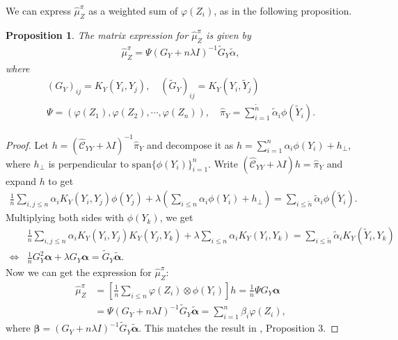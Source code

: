 \documentclass[a4paper]{article}
\renewcommand{\cal}{\mathcal}
\newcommand{\bs}{\boldsymbol}
\newtheorem{proposition}{Proposition}
\begin{document}
We can express $\widehat{\mu}_Z^\pi$ as a weighted sum of $\varphi(Z_i)$, as in the following proposition.
\begin{proposition}\label{prop:muz}
The matrix expression for $\widehat{\mu}_{Z}^\pi$ is given by
\begin{align}
\widehat{\mu}_Z^\pi = \Psi (G_Y + n \lambda I)^{-1} \tilde{G}_Y \tilde{\alpha},
\end{align}
where
\begin{gather}
(G_{Y})_{ij} = K_Y(Y_i,Y_j),\quad (\tilde{G}_{Y})_{ij} = K_Y(Y_i,\tilde{Y}_j)\\
\Psi = (\varphi(Z_1),\varphi(Z_2),\cdots,\varphi(Z_n)),\quad \widehat{\pi}_Y = \sum_{i=1}^{\tilde{n}}\tilde{\alpha}_i \phi(\tilde{Y}_i).
\end{gather}
\end{proposition}
\begin{proof}
Let $h = (\widehat{\cal{C}}_{YY}+\lambda I)^{-1}\widehat{\pi}_Y$ and decompose it as $h = \sum_{i=1}^n \alpha_i \phi(Y_i) + h_\perp$, where $h_\perp$ is perpendicular to $\mathrm{span}\{\phi(Y_i)\}_{i=1}^n$. Write $(\widehat{\cal{C}}_{YY}+\lambda I)h = \widehat{\pi}_Y$ and expand $h$ to get
\begin{align}
\frac{1}{n}\sum_{i,j\leq n} \alpha_i K_Y(Y_i,Y_j) \phi(Y_j) + \lambda(\sum_{i\leq n} \alpha_i \phi(Y_i) + h_\perp) = \sum_{i\leq \tilde{n}}\tilde{\alpha}_i \phi(\tilde{Y}_i).
\end{align}
Multiplying both sides with $\phi(Y_k)$, we get
\begin{align}
&\frac{1}{n}\sum_{i,j\leq n} \alpha_i K_Y(Y_i,Y_j) K_Y(Y_j,Y_k) + \lambda \sum_{i\leq n} \alpha_i K_Y(Y_i,Y_k) = \sum_{i\leq \tilde{n}}\tilde{\alpha}_i K_Y(\tilde{Y}_i,Y_k)\\
\Leftrightarrow& \frac{1}{n}G_Y^2 \bs{\alpha} + \lambda G_Y \bs{\alpha} = \tilde{G}_Y\bs{\tilde{\alpha}}.
\end{align}
Now we can get the expression for $\widehat{\mu}_Z^\pi$:
\begin{align}
\widehat{\mu}_Z^\pi &= \left[\frac{1}{n}\sum_{i\leq n}\varphi(Z_i)\otimes \phi(Y_i)\right] h = \frac{1}{n} \Psi G_Y \bs{\alpha}\\
&= \Psi (G_Y + n \lambda I)^{-1} \tilde{G}_Y \tilde{\bs{\alpha}} = \sum_{i=1}^n \beta_i \varphi(Z_i),
\end{align}
where $\boxed{\bs{\beta} = (G_Y+n\lambda I)^{-1} \tilde{G}_Y \tilde{\bs{\alpha}}}$. This matches the result in \cite{fukumizu2011kernel}, Proposition 3.
\end{proof}
\end{document}
